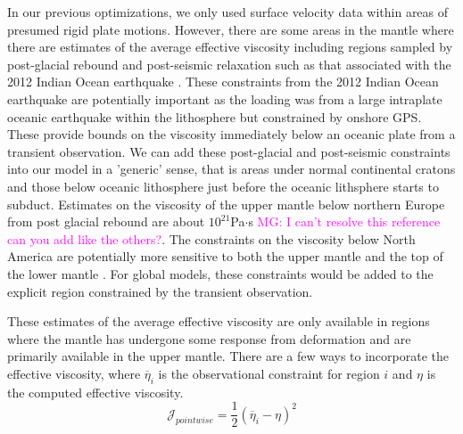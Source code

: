 \documentclass[12pt]{article}
\newcommand{\mgnote}[1]{\textcolor{magenta}{MG: #1}}
\begin{document}
In our previous optimizations, we only used surface velocity data within areas of presumed rigid plate motions. 
However, there are some areas in the mantle where there are estimates of the average effective viscosity including regions sampled by post-glacial rebound and post-seismic relaxation such as that associated with the 2012 Indian Ocean earthquake \citep{hu2016asthenosphere}.  
These constraints from the 2012 Indian Ocean earthquake are potentially important as the loading was from a large intraplate oceanic earthquake within the lithosphere but constrained by onshore GPS. These provide bounds on the viscosity immediately below an oceanic plate from a transient observation. We can add these post-glacial and post-seismic constraints into our model in a 'generic' sense, that is areas under normal continental cratons and those below oceanic lithosphere just before the oceanic lithsphere starts to subduct. Estimates on the viscosity of the upper mantle below northern Europe from post glacial rebound are about $10^{21}$Pa$\cdot$s \mgnote{I can't resolve this reference can you add like the others?}\citep{10.2307/j.ctt13x0t47}. The constraints on the viscosity below North America are potentially more sensitive to both the upper mantle and the top of the lower mantle \citep{mitrovica1995constraints,simons1997localization}. For global models, these constraints would be added to the explicit region constrained by the transient observation.

These estimates of the average effective viscosity are only available in regions where the mantle has undergone some response from deformation and are primarily available in the upper mantle.   There are a few ways to incorporate the effective viscosity, where $\overline{\eta}_i$ is the observational constraint for region $i$ and $\eta$ is the computed effective viscosity.
\begin{equation}
   \mathcal{J}_{pointwise}=  \frac{1}{2}(\overline{\eta}_i - \eta)^{2}
\label{eq:pointwise}
\end{equation}



 
\end{document}
